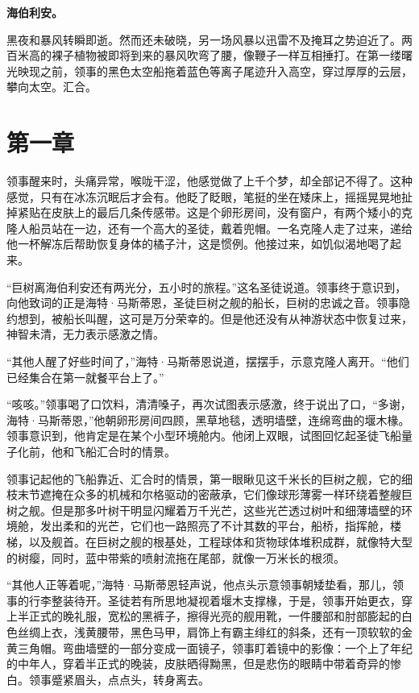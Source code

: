 \documentclass[AutoFakeBold=true]{book}
\begin{document}
{\bf \kaishu 海伯利安。}

黑夜和暴风转瞬即逝。然而还未破晓，另一场风暴以迅雷不及掩耳之势迫近了。两百米高的裸子植物被即将到来的暴风吹弯了腰，像鞭子一样互相捶打。在第一缕曙光映现之前，领事的黑色太空船拖着蓝色等离子尾迹升入高空，穿过厚厚的云层，攀向太空。汇合。

\chapter{第一章}

领事醒来时，头痛异常，喉咙干涩，他感觉做了上千个梦，却全部记不得了。这种感觉，只有在冰冻沉眠后才会有。他眨了眨眼，笔挺的坐在矮床上，摇摇晃晃地扯掉紧贴在皮肤上的最后几条传感带。这是个卵形房间，没有窗户，有两个矮小的克隆人船员站在一边，还有一个高大的圣徒，戴着兜帽。一名克隆人走了过来，递给他一杯解冻后帮助恢复身体的橘子汁，这是惯例。他接过来，如饥似渴地喝了起来。

``巨树离海伯利安还有两光分，五小时的旅程。''这名圣徒说道。领事终于意识到，向他致词的正是海特·马斯蒂恩，圣徒巨树之舰的船长，巨树的忠诚之音。领事隐约想到，被船长叫醒，这可是万分荣幸的。但是他还没有从神游状态中恢复过来，神智未清，无力表示感激之情。

``其他人醒了好些时间了，''海特·马斯蒂恩说道，摆摆手，示意克隆人离开。``他们已经集合在第一就餐平台上了。''

``咳咳。''领事喝了口饮料，清清嗓子，再次试图表示感激，终于说出了口，``多谢，海特·马斯蒂恩，''他朝卵形房间四顾，黑草地毯，透明墙壁，连绵弯曲的堰木椽。领事意识到，他肯定是在某个小型环境舱内。他闭上双眼，试图回忆起圣徒飞船量子化前，他和飞船汇合时的情景。

领事记起他的飞船靠近、汇合时的情景，第一眼瞅见这千米长的巨树之舰，它的细枝末节遮掩在众多的机械和尔格驱动的密蔽承，它们像球形薄雾一样环绕着整艘巨树之舰。但是那多叶树干明显闪耀着万千光芒，这些光芒透过树叶和细薄墙壁的环境舱，发出柔和的光芒，它们也一路照亮了不计其数的平台，船桥，指挥舱，楼梯，以及舰首。在巨树之舰的根基处，工程球体和货物球体堆积成群，就像特大型的树瘿，同时，蓝中带紫的喷射流拖在尾部，就像一万米长的根须。

``其他人正等着呢，''海特·马斯蒂恩轻声说，他点头示意领事朝矮垫看，那儿，领事的行李整装待开。圣徒若有所思地凝视着堰木支撑椽，于是，领事开始更衣，穿上半正式的晚礼服，宽松的黑裤子，擦得光亮的舰用靴，一件腰部和肘部膨起的白色丝绸上衣，浅黄腰带，黑色马甲，肩饰上有霸主绯红的斜条，还有一顶软软的金黄三角帽。弯曲墙壁的一部分变成一面镜子，领事盯着镜中的影像：一个上了年纪的中年人，穿着半正式的晚装，皮肤晒得黝黑，但是悲伤的眼睛中带着奇异的惨白。领事蹙紧眉头，点点头，转身离去。
\end{document}
